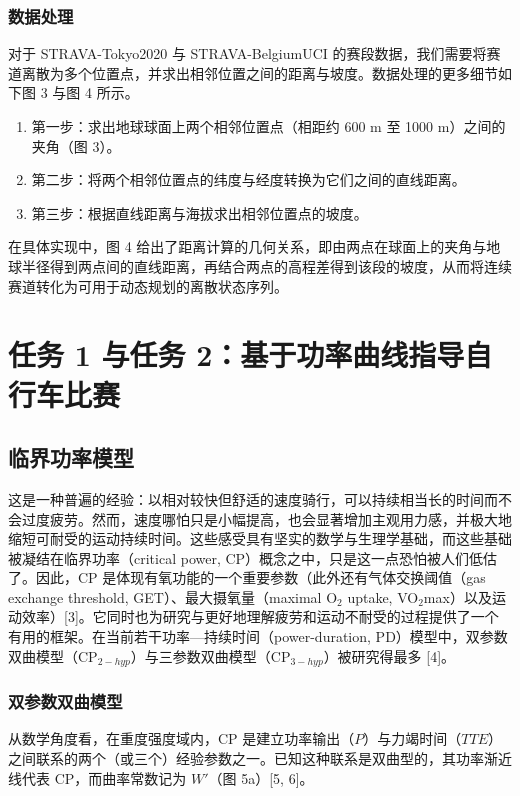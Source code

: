 \documentclass[11pt,a4paper]{ctexart}
\begin{document}
\subsubsection{数据处理}

对于 STRAVA-Tokyo2020 与 STRAVA-BelgiumUCI 的赛段数据，我们需要将赛道离散为多个位置点，并求出相邻位置之间的距离与坡度。数据处理的更多细节如下图 3 与图 4 所示。

\begin{enumerate}
\item 第一步：求出地球球面上两个相邻位置点（相距约 600 m 至 1000 m）之间的夹角（图 3）。
\item 第二步：将两个相邻位置点的纬度与经度转换为它们之间的直线距离。
\item 第三步：根据直线距离与海拔求出相邻位置点的坡度。
\end{enumerate}

在具体实现中，图 4 给出了距离计算的几何关系，即由两点在球面上的夹角与地球半径得到两点间的直线距离，再结合两点的高程差得到该段的坡度，从而将连续赛道转化为可用于动态规划的离散状态序列。
﻿\section{任务 1 与任务 2：基于功率曲线指导自行车比赛}

\subsection{临界功率模型}

这是一种普遍的经验：以相对较快但舒适的速度骑行，可以持续相当长的时间而不会过度疲劳。然而，速度哪怕只是小幅提高，也会显著增加主观用力感，并极大地缩短可耐受的运动持续时间。这些感受具有坚实的数学与生理学基础，而这些基础被凝结在临界功率（critical power, CP）概念之中，只是这一点恐怕被人们低估了。因此，CP 是体现有氧功能的一个重要参数（此外还有气体交换阈值（gas exchange threshold, GET）、最大摄氧量（maximal O$_2$ uptake, VO$_2$max）以及运动效率）[3]。它同时也为研究与更好地理解疲劳和运动不耐受的过程提供了一个有用的框架。在当前若干功率—持续时间（power-duration, PD）模型中，双参数双曲模型（CP$_{2-hyp}$）与三参数双曲模型（CP$_{3-hyp}$）被研究得最多 [4]。

\subsubsection{双参数双曲模型}

从数学角度看，在重度强度域内，CP 是建立功率输出（$P$）与力竭时间（$TTE$）之间联系的两个（或三个）经验参数之一。已知这种联系是双曲型的，其功率渐近线代表 CP，而曲率常数记为 $W'$（图 5a）[5, 6]。
\end{document}
